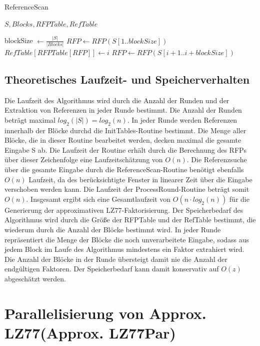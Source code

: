 \begin{algorithm}[ht]
\centering
\caption{ReferenceScan}
\algorithmicrequire $S, Blocks, RFPTable, RefTable$
\begin{algorithmic}
    \STATE blockSize $\gets \frac{|S|}{|Blocks|}$
    \STATE $RFP \gets RFP(S[1..blockSize])$
            \STATE $RefTable[RFPTable[RFP]] \gets i$
        \ENDIF
        \STATE $RFP \gets RFP(S[i+1..i+blockSize])$ 
    \ENDFOR
\end{algorithmic}
\end{algorithm}


\subsection{Theoretisches Laufzeit- und Speicherverhalten}
Die Laufzeit des Algorithmus wird durch die Anzahl der Runden und der Extraktion von Referenzen in jeder Runde bestimmt. Die Anzahl der Runden beträgt maximal $log_2(|S|)=log_2(n)$. In jeder Runde
werden Referenzen innerhalb der Blöcke durchd die InitTables-Routine bestimmt. Die Menge aller Blöcke, die in dieser Routine bearbeitet werden, decken maximal die gesamte Eingabe S ab. Die Laufzeit
der Routine erhält durch die Berechnung des RFPs über dieser Zeichenfolge eine Laufzeitschätzung von $O(n)$. Die Referenzsuche über die gesamte Eingabe durch die ReferenceScan-Routine benötigt ebenfalls
$O(n)$ Laufzeit, da des berücksichtigte Fenster in linearer Zeit über die Eingabe verschoben werden kann. Die Laufzeit der ProcessRound-Routine beträgt somit $O(n)$. Insgesamt ergibt sich eine
Gesamtlaufzeit von $O(n \cdot log_2(n))$ für die Generierung der approximativen LZ77-Faktorisierung. Der Speicherbedarf des Algorithmus wird durch die Größe der RFPTable und der RefTable bestimmt, die
wiederum durch die Anzahl der Blöcke bestimmt wird. In jeder Runde repräsentiert die Menge der Blöcke die noch unverarbeitete Eingabe, sodass aus jedem Block im Laufe des Algorithmus mindestens ein
Faktor extrahiert wird. Die Anzahl der Blöcke in der Runde übersteigt damit nie die Anzahl der endgültigen Faktoren. Der Speicherbedarf kann damit konservativ auf $O(z)$ abgeschätzt werden.

\section{Parallelisierung von Approx. LZ77(Approx. LZ77Par)}
